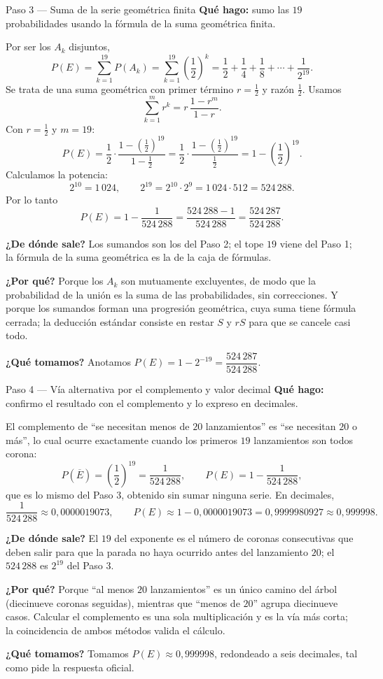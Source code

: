 \documentclass[11pt]{article}
\begin{document}
\begin{paso}{Paso 3 --- Suma de la serie geométrica finita}
\textbf{Qué hago:} sumo las $19$ probabilidades usando la fórmula de la suma geométrica finita.

Por ser los $A_k$ disjuntos,
\[
P(E)=\sum_{k=1}^{19}P(A_k)=\sum_{k=1}^{19}\left(\frac{1}{2}\right)^{k}
=\frac12+\frac14+\frac18+\cdots+\frac{1}{2^{19}} .
\]
Se trata de una suma geométrica con primer término $r=\tfrac12$ y razón $\tfrac12$. Usamos
\[
\sum_{k=1}^{m}r^{k}=r\,\frac{1-r^{m}}{1-r}.
\]
Con $r=\tfrac12$ y $m=19$:
\[
P(E)=\frac{1}{2}\cdot\frac{1-\left(\frac12\right)^{19}}{1-\frac12}
=\frac{1}{2}\cdot\frac{1-\left(\frac12\right)^{19}}{\frac12}
=1-\left(\frac{1}{2}\right)^{19}.
\]
Calculamos la potencia:
\[
2^{10}=1\,024,
\qquad
2^{19}=2^{10}\cdot 2^{9}=1\,024\cdot 512=524\,288 .
\]
Por lo tanto
\[
P(E)=1-\frac{1}{524\,288}=\frac{524\,288-1}{524\,288}=\frac{524\,287}{524\,288}.
\]

\textbf{¿De dónde sale?} Los sumandos son los del Paso 2; el tope $19$ viene del Paso 1; la fórmula de la suma geométrica es la de la caja de fórmulas.

\textbf{¿Por qué?} Porque los $A_k$ son mutuamente excluyentes, de modo que la probabilidad de la unión es la suma de las probabilidades, sin correcciones. Y porque los sumandos forman una progresión geométrica, cuya suma tiene fórmula cerrada; la deducción estándar consiste en restar $S$ y $rS$ para que se cancele casi todo.

\textbf{¿Qué tomamos?} Anotamos $P(E)=1-2^{-19}=\dfrac{524\,287}{524\,288}$.
\end{paso}

\begin{paso}{Paso 4 --- Vía alternativa por el complemento y valor decimal}
\textbf{Qué hago:} confirmo el resultado con el complemento y lo expreso en decimales.

El complemento de ``se necesitan menos de $20$ lanzamientos'' es ``se necesitan $20$ o más'', lo cual ocurre exactamente cuando los primeros $19$ lanzamientos son todos corona:
\[
P(\overline{E})=\left(\frac{1}{2}\right)^{19}=\frac{1}{524\,288},
\qquad
P(E)=1-\frac{1}{524\,288},
\]
que es lo mismo del Paso 3, obtenido sin sumar ninguna serie. En decimales,
\[
\frac{1}{524\,288}\approx 0{,}0000019073,
\qquad
P(E)\approx 1-0{,}0000019073=0{,}9999980927\approx 0{,}999998 .
\]

\textbf{¿De dónde sale?} El $19$ del exponente es el número de coronas consecutivas que deben salir para que la parada no haya ocurrido antes del lanzamiento $20$; el $524\,288$ es $2^{19}$ del Paso 3.

\textbf{¿Por qué?} Porque ``al menos $20$ lanzamientos'' es un único camino del árbol (diecinueve coronas seguidas), mientras que ``menos de $20$'' agrupa diecinueve casos. Calcular el complemento es una sola multiplicación y es la vía más corta; la coincidencia de ambos métodos valida el cálculo.

\textbf{¿Qué tomamos?} Tomamos $P(E)\approx 0{,}999998$, redondeado a seis decimales, tal como pide la respuesta oficial.
\end{paso}
\end{document}
